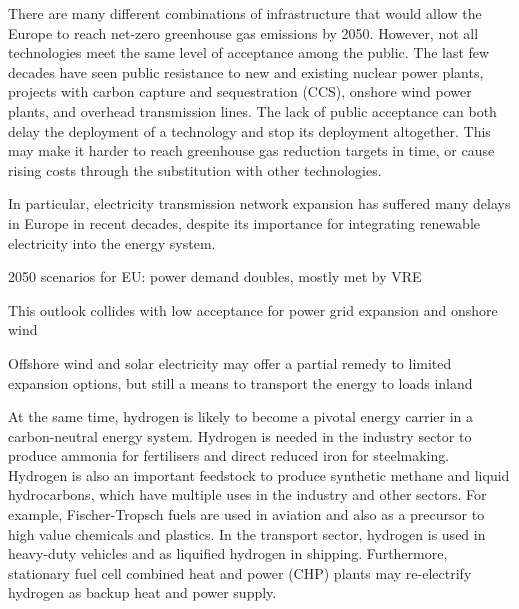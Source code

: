 
There are many different combinations of infrastructure that would allow the
Europe to reach net-zero greenhouse gas emissions by 2050. However, not all
technologies meet the same level of acceptance among the public. The last few
decades have seen public resistance to new and existing nuclear power plants,
projects with carbon capture and sequestration (CCS), onshore wind power plants,
and overhead transmission lines. The lack of public acceptance can both delay
the deployment of a technology and stop its deployment altogether. This may make
it harder to reach greenhouse gas reduction targets in time, or cause rising
costs through the substitution with other technologies.


In particular, electricity transmission network expansion has suffered many
delays in Europe in recent decades, despite its importance for integrating
renewable electricity into the energy system.

2050 scenarios for EU: power demand doubles, mostly met by VRE \cite{}

This outlook collides with low acceptance for power grid expansion and onshore
wind

Offshore wind and solar electricity may offer a partial remedy to limited
expansion options, but still a means to transport the energy to loads inland


At the same time, hydrogen is likely to become a pivotal energy carrier in a
carbon-neutral energy system. Hydrogen is needed in the industry sector to
produce ammonia for fertilisers and direct reduced iron for steelmaking.
Hydrogen is also an important feedstock to produce synthetic methane and liquid
hydrocarbons, which have multiple uses in the industry and other sectors. For
example, Fischer-Tropsch fuels are used in aviation and also as a precursor to
high value chemicals and plastics. In the transport sector, hydrogen is used in
heavy-duty vehicles and as liquified hydrogen in shipping. Furthermore,
stationary fuel cell combined heat and power (CHP) plants may re-electrify
hydrogen as backup heat and power supply.


